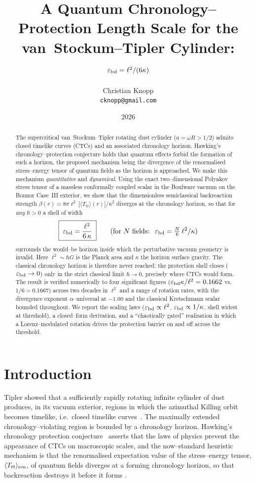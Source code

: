 \documentclass[11pt]{article}
\title{A Quantum Chronology--Protection Length Scale for the\\
van~Stockum--Tipler Cylinder: $\varepsilon_{\rm bd}=\ell^{2}/(6\kappa)$}
\author{Christian Knopp\\\texttt{cknopp@gmail.com}}
\date{2026}
\newcommand{\Ttt}{\langle T_{tt}\rangle}
\newcommand{\ebd}{\varepsilon_{\rm bd}}
\begin{document}
\maketitle

\begin{abstract}
The supercritical van~Stockum--Tipler rotating dust cylinder ($a=\omega R>1/2$) admits closed
timelike curves (CTCs) and an associated chronology horizon. Hawking's chronology--protection
conjecture holds that quantum effects forbid the formation of such a horizon, the proposed
mechanism being the divergence of the renormalised stress--energy tensor of quantum fields as
the horizon is approached. We make this mechanism \emph{quantitative} and \emph{dynamical}.
Using the exact two--dimensional Polyakov stress tensor of a massless conformally coupled
scalar in the Boulware vacuum on the Bonnor Case~III exterior, we show that the dimensionless
semiclassical backreaction strength
$\beta(r)=8\pi\ell^{2}\,|\Ttt(r)|/\kappa^{2}$
diverges at the chronology horizon, so that for \emph{any} $\hbar>0$ a shell of width
\[
\boxed{\;\ebd=\frac{\ell^{2}}{6\,\kappa}\;}\qquad(\text{for }N\text{ fields: }\ \ebd=\tfrac{N}{6}\,\ell^{2}/\kappa)
\]
surrounds the would--be horizon inside which the perturbative vacuum geometry is invalid. Here
$\ell^{2}\sim\hbar G$ is the Planck area and $\kappa$ the horizon surface gravity. The classical
chronology horizon is therefore never reached; the protection shell closes ($\ebd\to0$) only in
the strict classical limit $\hbar\to0$, precisely where CTCs would form. The result is verified
numerically to four significant figures ($\ebd\kappa/\ell^{2}=0.1662$ vs.\ $1/6=0.1667$) across
two decades in $\ell^{2}$ and a range of rotation rates, with the divergence exponent
$\alpha$--universal at $-1.00$ and the classical Kretschmann scalar bounded throughout. We
report the scaling laws ($\ebd\propto\ell^{2}$, $\ebd\propto1/\kappa$, shell widest at
threshold), a closed--form derivation, and a ``chaotically gated'' realisation in which a
Lorenz--modulated rotation drives the protection barrier on and off across the threshold.
\end{abstract}

\section{Introduction}
Tipler showed that a sufficiently rapidly rotating infinite cylinder of dust produces, in its
vacuum exterior, regions in which the azimuthal Killing orbit becomes timelike, i.e.\ closed
timelike curves~\cite{Tipler1974,vanStockum1937,Bonnor1980}. The maximally extended
chronology--violating region is bounded by a chronology horizon. Hawking's chronology
protection conjecture~\cite{Hawking1992} asserts that the laws of physics prevent the
appearance of CTCs on macroscopic scales, and the now--standard heuristic mechanism is that the
renormalised expectation value of the stress--energy tensor, $\Ttt_{\rm ren}$, of quantum fields
diverges at a forming chronology horizon, so that backreaction destroys it before it forms
\cite{KimThorne1991,Visser2003}.
\end{document}
